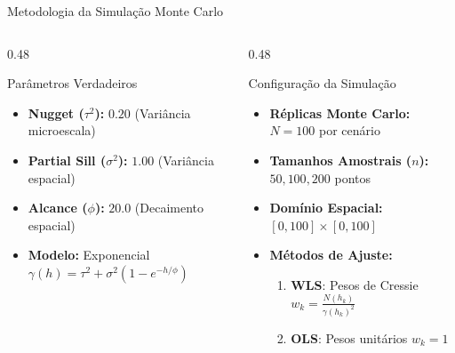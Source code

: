 \documentclass[10pt,aspectratio=169]{beamer}
\begin{document}
\begin{frame}{Metodologia da Simulação Monte Carlo}
  \begin{columns}[T]
    \begin{column}{0.48\textwidth}
      \begin{block}{Parâmetros Verdadeiros}
        \begin{itemize}
          \item \textbf{Nugget ($\tau^2$):} $0.20$ (Variância microescala)
          \item \textbf{Partial Sill ($\sigma^2$):} $1.00$ (Variância espacial)
          \item \textbf{Alcance ($\phi$):} $20.0$ (Decaimento espacial)
          \item \textbf{Modelo:} Exponencial $\gamma(h) = \tau^2 + \sigma^2(1 - e^{-h/\phi})$
        \end{itemize}
      \end{block}
    \end{column}

    \begin{column}{0.48\textwidth}
      \begin{block}{Configuração da Simulação}
        \begin{itemize}
          \item \textbf{Réplicas Monte Carlo:} $N = 100$ por cenário
          \item \textbf{Tamanhos Amostrais ($n$):} $50, 100, 200$ pontos
          \item \textbf{Domínio Espacial:} $[0, 100] \times [0, 100]$
          \item \textbf{Métodos de Ajuste:}
            \begin{enumerate}
              \item \textbf{WLS}: Pesos de Cressie $w_k = \frac{N(h_k)}{\gamma(h_k)^2}$
              \item \textbf{OLS}: Pesos unitários $w_k = 1$
            \end{enumerate}
        \end{itemize}
      \end{block}
    \end{column}
  \end{columns}
\end{frame}
\end{document}
